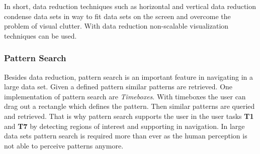In short, data reduction techniques such as horizontal and vertical data reduction condense  data sets in way to fit data sets on the screen and overcome the problem of visual clutter. With data reduction non-scalable visualization techniques can be used. 


\subsubsection{Pattern Search}\label{patternsearch}
Besides data reduction, pattern search is an important feature in navigating in a large data set. Given a defined pattern similar patterns are retrieved. One implementation of pattern search are \textit{Timeboxes}\cite{Buono}. With timeboxes the user can drag out a rectangle which defines the pattern. Then similar patterns are queried and retrieved. That is why pattern search supports the user in the user tasks \textbf{T1} and \textbf{T7} by detecting regions of interest and supporting in navigation. In large data sets pattern search is required more than ever as the human perception is not able to perceive patterns anymore.


